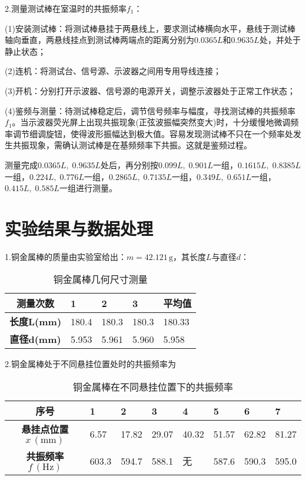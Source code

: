 \documentclass[UTF-8,twoside,cs4size]{ctexart}
\newcommand*{\tab}{\indent}
\begin{document}
	2.测量测试棒在室温时的共振频率$ f_1 $：
	
	\tab\tab (1)安装测试棒：将测试棒悬挂于两悬线上，要求测试棒横向水平，悬线于测试棒轴向垂直，两悬线挂点到测试棒两端点的距离分别为$ 0.0365L $和$ 0.9635L $处，并处于静止状态；
	
	\tab\tab (2)连机：将测试台、信号源、示波器之间用专用导线连接；
	
	\tab\tab (3)开机：分别打开示波器、信号源的电源开关，调整示波器处于正常工作状态；
	
	\tab\tab (4)鉴频与测量：待测试棒稳定后，调节信号频率与幅度，寻找测试棒的共振频率$ f_1 $。当示波器荧光屏上出现共振现象(正弦波振幅突然变大)时，十分缓慢地微调频率调节细调旋钮，使得波形振幅达到极大值。容易发现测试棒不只在一个频率处发生共振现象，需确认测试棒是在基频频率下共振。这就是鉴频过程。
	
	测量完成$ 0.0365L,\;0.9635L $处后，再分别按$ 0.099L,\;0.901L $一组，$ 0.1615L,\;0.8385L $一组，$ 0.224L,\;0.776L $一组，$ 0.2865L,\;0.7135L $一组，$ 0.349L,\;0.651L $一组，$ 0.415L,\;0.585L $一组进行测量。
	
	\section{实验结果与数据处理}
	1.铜金属棒的质量由实验室给出：$ m=42.121\,\mathrm g $，其长度$ L $与直径$ d $：
	\begin{table}[!h]
		\centering
		\begin{tabularx}{\textwidth}{|c|Y|Y|Y|Y|}
			\hline
			\textbf{测量次数}&\textbf{1}&\textbf{2}&\textbf{3}&\textbf{平均值}\\
			\hline
			\textbf{长度$ \bm L $(mm)}&180.4&180.3&180.3&180.33\\
			\hline
			\textbf{直径$ \bm d $(mm)}&5.953&5.961&5.960&5.958\\
			\hline
		\end{tabularx}
		\caption{铜金属棒几何尺寸测量}
	\end{table}

	2.铜金属棒处于不同悬挂位置处时的共振频率为
	\begin{table}[!h]
		\centering
		\begin{tabularx}{\textwidth}{|c|Y|Y|Y|Y|Y|Y|Y|}
			\hline
			\textbf{序号}&\textbf{1}&\textbf{2}&\textbf{3}&\textbf{4}&\textbf{5}&\textbf{6}&\textbf{7}\\
			\hline
			\textbf{悬挂点位置$ x\,\mathrm{(mm)} $}&6.57&17.82&29.07&40.32&51.57&62.82&81.27\\
			\hline
			\textbf{共振频率$ {f}\,(\mathrm{Hz}) $}&603.3&594.7&588.1&无&587.6&590.3&595.0\\
			\hline
		\end{tabularx}
		\caption{铜金属棒在不同悬挂位置下的共振频率}
	\end{table}
\end{document}
